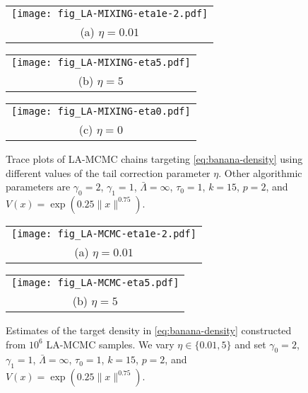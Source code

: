 \begin{figure}
  \centering

  \begin{tabular}{@{}c@{}}
    \texttt{[image: fig\_LA-MIXING-eta1e-2.pdf]} \\[\abovecaptionskip]
    \small (a) $\eta=0.01$
  \end{tabular}
  
  \begin{tabular}{@{}c@{}}
    \texttt{[image: fig\_LA-MIXING-eta5.pdf]} \\[\abovecaptionskip]
    \small (b) $\eta=5$
  \end{tabular}
  
  \begin{tabular}{@{}c@{}}
    \texttt{[image: fig\_LA-MIXING-eta0.pdf]} \\[\abovecaptionskip]
    \small (c) $\eta=0$
  \end{tabular}
  
  \caption{Trace plots of LA-MCMC chains targeting \eqref{eq:banana-density} using different values of the tail correction parameter $\eta$. Other algorithmic parameters are $\gamma_0 = 2$, $\gamma_1 = 1$, $\bar{\Lambda} = \infty$, $\tau_0 = 1$, $k = 15$, $p = 2$, and $V(x) = \exp{(0.25 \|x\|^{0.75})}$.}
  \label{fig:banana-density-la-mixing}
\end{figure}

\begin{figure}
  \centering
  
  \begin{tabular}{@{}c@{}}
    \texttt{[image: fig\_LA-MCMC-eta1e-2.pdf]} \\[\abovecaptionskip]
    \small (a) $\eta=0.01$
  \end{tabular}

  \begin{tabular}{@{}c@{}}
    \texttt{[image: fig\_LA-MCMC-eta5.pdf]} \\[\abovecaptionskip]
    \small (b) $\eta=5$
  \end{tabular}
  
  \caption{Estimates of the target density in \eqref{eq:banana-density} constructed from $10^6$ LA-MCMC samples. We vary $\eta \in \{0.01, 5\}$ and set $\gamma_0 = 2$, $\gamma_1 = 1$, $\bar{\Lambda} = \infty$, $\tau_0 = 1$, $k = 15$, $p = 2$, and $V(x) = \exp{(0.25 \|x\|^{0.75})}$.}
  \label{fig:banana-density-la}
\end{figure}
